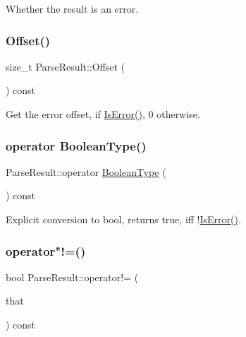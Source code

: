 Whether the result is an error. 

\mbox{\label{structParseResult_afbe762766ac21b2aae266105f1dfa643}} 
\subsubsection{\texorpdfstring{Offset()}{Offset()}}
{\footnotesize\ttfamily size\+\_\+t Parse\+Result\+::\+Offset (\begin{DoxyParamCaption}{ }\end{DoxyParamCaption}) const\hspace{0.3cm}{\ttfamily [inline]}}



Get the error offset, if \hyperlink{structParseResult_adfe0ef5b994e82f8aa9ebf0b30c924b1}{Is\+Error()}, 0 otherwise. 

\mbox{\label{structParseResult_abcd534680e4067ab797b1c6e930ac91c}} 
\subsubsection{\texorpdfstring{operator Boolean\+Type()}{operator BooleanType()}}
{\footnotesize\ttfamily Parse\+Result\+::operator \hyperlink{structParseResult_a991cd2759ba802bdb5e960d40890e874}{Boolean\+Type} (\begin{DoxyParamCaption}{ }\end{DoxyParamCaption}) const\hspace{0.3cm}{\ttfamily [inline]}}



Explicit conversion to {\ttfamily bool}, returns {\ttfamily true}, iff !\hyperlink{structParseResult_adfe0ef5b994e82f8aa9ebf0b30c924b1}{Is\+Error()}. 

\mbox{\label{structParseResult_aa1fcc912cede0ef0526e0cbfcb14e4c2}} 
\subsubsection{\texorpdfstring{operator"!=()}{operator!=()}\hspace{0.1cm}{\footnotesize\ttfamily [1/2]}}
{\footnotesize\ttfamily bool Parse\+Result\+::operator!= (\begin{DoxyParamCaption}\item[{const \hyperlink{structParseResult}{Parse\+Result} \&}]{that }\end{DoxyParamCaption}) const\hspace{0.3cm}{\ttfamily [inline]}}

